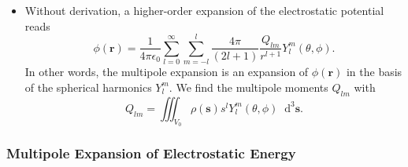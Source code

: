 \documentclass[11pt, a4paper]{article}
\newcommand{\diff}{\mathop{}\!\mathrm{d}} %
\renewcommand{\vec}[1]{\bm{#1}} %
\renewcommand{\r}{\vec{r}}
\newcommand{\ee}{\epsilon_{0}}  %
\newcommand{\s}{\vec{s}}  %
\newcommand{\ds}{\diff^{3} \s}  %
\begin{document}
\begin{itemize}
	\item Without derivation, a higher-order expansion of the electrostatic potential reads
	\begin{equation*}
		\phi(\r) = \frac{1}{4\pi \ee} \sum_{l=0}^{\infty}\sum_{m=-l}^{l}\frac{4\pi}{(2l+1)}\frac{Q_{lm}}{r^{l+1}}Y_{l}^{m}(\theta, \phi).
	\end{equation*}
	In other words, the multipole expansion is an expansion of $ \phi(\r) $ in the basis of the spherical harmonics $ Y_{l}^{m} $. We find the multipole moments $ Q_{lm} $ with
	\begin{equation*}
		Q_{lm} = \iiint_{V_{0}} \rho(\s)s^{l}Y_{l}^{m}(\theta, \phi) \ds.
	\end{equation*}
\end{itemize}

\subsubsection{Multipole Expansion of Electrostatic Energy}
\end{document}
